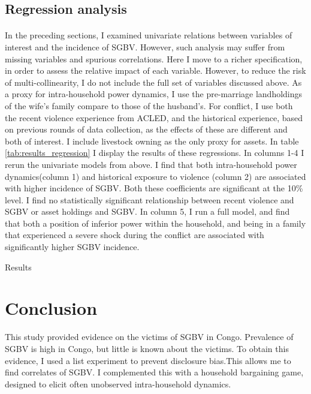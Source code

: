 \documentclass[11pt,a4paper]{scrartcl} %
\newcommand{\tableloc}{C:/Users/Koen/Dropbox/PhD/Papers/CongoGBV/Tables}
\begin{document}
\subsection*{Regression analysis}
\paragraph{}
In the preceding sections, I examined univariate relations between variables of interest and the incidence of SGBV. However, such analysis may suffer from missing variables and spurious correlations. Here I move to a richer specification, in order to assess the relative impact of each variable. However, to reduce the risk of multi-collinearity, I do not include the full set of variables discussed above. As a proxy for intra-household power dynamics, I use the pre-marriage landholdings of the wife's family compare to those of the husband's. For conflict, I use both the recent violence experience from ACLED, and the historical experience, based on previous rounds of data collection, as the effects of these are different and both of interest. I include livestock owning as the only proxy for assets. In table \ref{tab:results_regression} I display the results of these regressions. In columns 1-4 I rerun the univariate models from above. I find that both intra-household power dynamics(column 1) and historical exposure to violence (column 2) are associated with higher incidence of SGBV. Both these coefficients are significant at the 10\% level. I find no statistically significant relationship between recent violence and SGBV or asset holdings and SGBV.  In column 5, I run a full model, and find that both a position of inferior power within the household, and being in a family that experienced a severe shock during the conflict are associated with significantly higher SGBV incidence.

\newcommand{\coeffget}[3]{\csvreader[filter=\equal{\reg}{#1} \and \equal{\var}{#2}]{\tableloc/regs.csv}{var=\var,reg=\reg,#3=\coeff}{\coeff}}

\begin{table}
	\caption{Results}\label{tab:results_regression}
	\begin{center}
	
	\end{center}
\end{table}


\section*{Conclusion}
This study provided evidence on the victims of SGBV in Congo. Prevalence of SGBV is high in Congo, but little is known about the victims. To obtain this evidence, I used a list experiment to prevent disclosure bias.This allows me to find correlates of SGBV. I complemented this with a household bargaining game, designed to elicit often unobserved intra-household dynamics.
\end{document}
